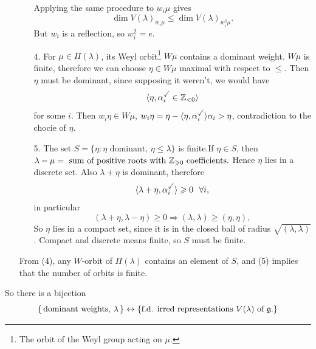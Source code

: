 \documentclass{article}
\begin{document}
\begin{enumerate}
\begin{enumerate}
    Applying the same procedure to $w_{i}\mu$ gives \[ \dim V(\lambda)_{w_{i}\mu} \leq \dim V(\lambda)_{w_{i}^{2}\mu}.\] But $w_{i}$ is a reflection, so $w_{i}^{2}=e$.
    \item[4.] For $\mu \in \Pi(\lambda)$, its Weyl orbit\footnote{The orbit of the Weyl group acting on $\mu$.} $W\mu$ contains a dominant weight. \gap $W\mu$ is finite, therefore we can choose $\eta \in W\mu$ maximal with respect to $\leq$. Then $\eta$ must be dominant, since supposing it weren't, we would have \[ \langle \eta, \alpha_{i}^{\checked} \in \bbZ_{< 0}\rangle \] for some $i$. Then $w_{i}\eta \in W\mu$, $w_{i}\eta = \eta - \langle \eta, \alpha_{i}^{\checked} \rangle \alpha_{i} > \eta$, contradiction to the chocie of $\eta$.
    \item[5.] The set $S = \{ \eta : \eta \text{ dominant, } \eta \leq \lambda \}$ is finite.\gap If $\eta \in S$, then $\lambda - \mu = \text{ sum of positive roots with $\mathbb{Z}_{\geqslant 0}$ coefficients}.$ Hence $\eta$ lies in a discrete set. Also $\lambda + \eta$ is dominant, therefore \[ \langle \lambda + \eta, \alpha_{i}^{\checked}\rangle \geq 0 \,\,\,\, \forall i,\] in particular \[ (\lambda+\eta,\lambda-\eta) \geq 0 \Rightarrow (\lambda, \lambda) \geq (\eta, \eta),\]
    So $\eta$ lies in a compact set, since it is in the closed ball of radius $\sqrt{(\lambda,\lambda)}$. Compact and discrete means finite, so $S$ must be finite.
    \end{enumerate}
    From (4), any $W$-orbit of $\Pi(\lambda)$ contains an element of $S$, and (5) implies that the number of orbits is finite.
\end{enumerate}
\endproof
So there is a bijection \[ \{\, \text{dominant weights, $\lambda$}\,\} \leftrightarrow \{\text{f.d. irred representations $V(\lambda)$ of $\mathfrak{g}$}.\}\] 
\end{document}
